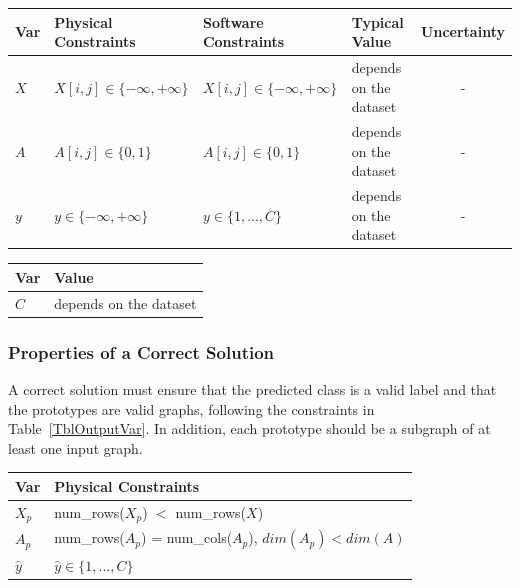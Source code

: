 \documentclass[12pt]{article}
\begin{document}
\begin{table}[!h]
  \caption{Input Variables} \label{TblInputVar}
  \renewcommand{\arraystretch}{1.2}
\noindent \begin{longtable*}{l l l l c} 
  \toprule
  \textbf{Var} & \textbf{Physical Constraints} & \textbf{Software Constraints} &
                             \textbf{Typical Value} & \textbf{Uncertainty}\\
  \midrule 
  $X$ & $X[i,j] \in \{-\infty, +\infty\}$ & $X[i,j] \in \{-\infty, +\infty\}$ & depends on the dataset & - \\
  $A$ & $A[i,j] \in \{0, 1\}$ & $A[i,j] \in \{0, 1\}$ & depends on the dataset & - \\
  $y$ & $y \in \{-\infty, +\infty\}$ & $y \in \{1, ..., C\}$ & depends on the dataset & - \\

  \bottomrule
\end{longtable*}
\end{table}


\begin{table}[!h]
\caption{Specification Parameter Values} \label{TblSpecParams}
\renewcommand{\arraystretch}{1.2}
\noindent \begin{longtable*}{l l} 
  \toprule
  \textbf{Var} & \textbf{Value} \\
  \midrule 
  $C$ & depends on the dataset\\
  \bottomrule
\end{longtable*}
\end{table}

\subsubsection{Properties of a Correct Solution} \label{sec_CorrectSolution}

\noindent
A correct solution must ensure that the predicted class is a valid label and that the prototypes are valid graphs, following the constraints in Table~\ref{TblOutputVar}. In addition, each prototype should be a subgraph of at least one input graph.


\begin{table}[!h]
\caption{Output Variables} \label{TblOutputVar}
\renewcommand{\arraystretch}{1.2}
\noindent \begin{longtable*}{l l} 
  \toprule
  \textbf{Var} & \textbf{Physical Constraints} \\
  \midrule 
  $X_p$ & num\_rows($X_p$) $<$ num\_rows($X$) \\
  $A_p$ & num\_rows($A_p$) = num\_cols($A_p$), $dim(A_p) < dim(A)$\\
  $\hat{y}$ & $\hat{y} \in \{1,...,C\}$ 
  \\
  \bottomrule
\end{longtable*}
\end{table}
\end{document}
